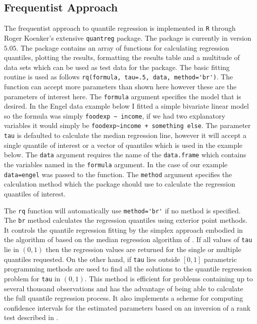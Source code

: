 \documentclass[12pt,a4paper]{report}
\begin{document}
\subsection{Frequentist Approach}
The frequentist approach to quantile regression is implemented in {\small\verb"R"} through Roger Koenker's extensive {\small\verb"quantreg"} package. The package is currently in version $5.05$. The package contains an array of functions for calculating regression quantiles, plotting the results, formatting the results table and a multitude of data sets which can be used as test data for the package. The basic fitting routine is used as follows {\small\verb"rq(formula, tau=.5, data, method='br')"}. The function can accept more parameters than shown here however these are the parameters of interest here. The {\small\verb"formula"} argument specifies the model that is desired. In the Engel data example below I fitted a simple bivariate linear model so the formula was simply {\small\verb"foodexp ~ income"}, if we had two explanatory variables it would simply be {\small\verb"foodexp~income + something else"}. The parameter {\small\verb"tau"} is defaulted to calculate the median regression line, however it will accept a single quantile of interest or a vector of quantiles which is used in the example below. The {\small\verb"data"} argument requires the name of the {\small\verb"data.frame"} which contains the variables named in the {\small\verb"formula"} argument. In the case of our example {\small\verb"data=engel"} was passed to the function. The {\small\verb"method"} argument specifies the calculation method which the package should use to calculate the regression quantiles of interest.
\vspace{2mm}

The {\small\verb"rq"} function will automatically use {\small\verb"method='br'"} if no method is specified. The {\small\verb"br"} method calculates the regression quantiles using exterior point methods. It controls the quantile regression fitting by the simplex approach embodied in the algorithm of \citet{KdO1987} based on the median regression algorithm of \citet{BR1974}. If all values of {\small\verb"tau"} lie in $(0,1)$ then the regression values are returned for the single or multiple quantiles requested. On the other hand, if {\small\verb"tau"} lies outside $[0,1]$ parametric programming methods are used to find all the solutions to the quantile regression problem for {\small\verb"tau"} in $(0,1)$. This method is efficient for problems containing up to several thousand observations and has the advantage of being able to calculate the full quantile regression process. It also implements a scheme for computing confidence intervals for the estimated parameters based on an inversion of a rank test described in \citet{RK1994}.
\vspace{2mm}
\end{document}
